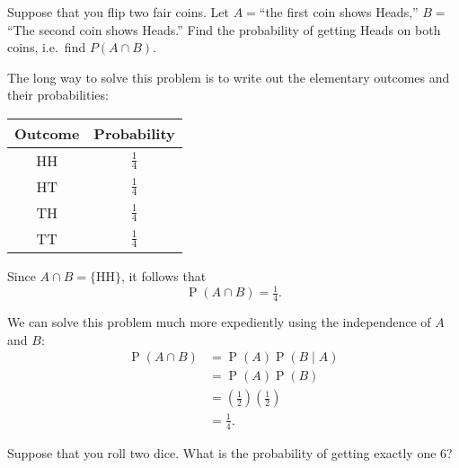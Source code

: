 \documentclass[11pt]{exam}
\DeclareMathOperator*{\Prob}{P}
\renewcommand{\Pr}{\Prob}
\begin{document}
\begin{questions}
\begin{parts}
\begin{solution}
\end{solution}

\end{parts}

 \newpage
{}
\question Suppose that you flip two fair coins.  Let $A = $``the first coin shows
Heads,'' $B = $ ``The second coin shows Heads.''  Find the probability
of getting Heads on both coins, i.e.~find $P(A \cap B)$.

\begin{solution}
The long way to solve this problem is to write out the elementary outcomes and
their probabilities:

\vspace{1\baselineskip}
\begin{center}
\begin{tabular}{cc}
\toprule
Outcome & Probability \\
\midrule
HH & $\tfrac{1}{4}$ \\
HT & $\tfrac{1}{4}$ \\
TH & $\tfrac{1}{4}$ \\
TT & $\tfrac{1}{4}$ \\
\bottomrule
\end{tabular}
\end{center}
\vspace{1\baselineskip}

Since $A \cap B = \{ \text{HH} \}$, it follows that
\[
  \Pr(A \cap B) = \tfrac{1}{4}.
\]

We can solve this problem much more expediently using the independence of $A$
and $B$:
\begin{align*}
  \Pr(A \cap B)
  &= \Pr(A) \Pr(B \mid A) \\
  &= \Pr(A) \Pr(B) \\
  &= (\tfrac{1}{2}) (\tfrac{1}{2}) \\
  &= \tfrac{1}{4}.
\end{align*}

\end{solution}


\question Suppose that you roll two dice.  What is the probability of getting exactly
one 6?


\end{questions}
\end{document}
